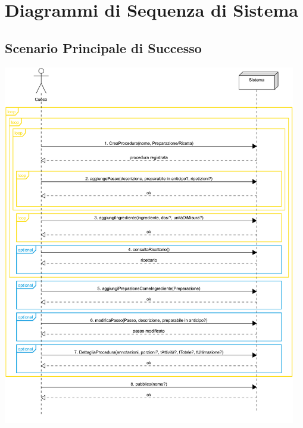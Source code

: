 \chapter{Diagrammi di Sequenza di Sistema}
\section*{Scenario Principale di Successo}
\begin{center}
  \includegraphics[max width=\textwidth, max height=158mm]{../resources/img/GRP/SSD/main.png}
\end{center}

